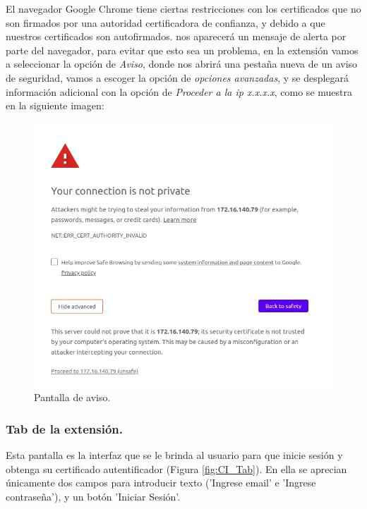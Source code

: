 \documentclass[12pt, a4paper, titlepage]{report}
\begin{document}
    			El navegador Google Chrome tiene ciertas restricciones con los certificados que no son firmados por una autoridad certificadora de confianza, y debido a que nuestros certificados son autofirmados. nos aparecerá un mensaje de alerta por parte del navegador, para evitar que esto sea un problema, en la extensión vamos a seleccionar la opción de \textit{Aviso}, donde nos abrirá una pestaña nueva de un aviso de seguridad, vamos a escoger la opción de \textit{opciones avanzadas}, y se desplegará información adicional con la opción de \textit{Proceder a la ip x.x.x.x}, como se muestra en la siguiente imagen: 
    			
    			\begin{figure}[H]
    				\begin{center}	\includegraphics[width=12cm]{./imagenes/Disenio/Componente_1/Ext_aviso.png}
    				\caption{Pantalla de aviso.}
    		        \label{fig:Ext_aviso}
    				\end{center}
    			\end{figure}
    			
    			\subsubsection{Tab de la extensión.}
    			Esta pantalla es la interfaz que se le brinda al usuario para que inicie sesión y obtenga su certificado autentificador (Figura \ref{fig:CI_Tab}). En ella se aprecian únicamente dos campos para introducir texto ('Ingrese email' e 'Ingrese contraseña'), y un botón 'Iniciar Sesión'.
    			  
\end{document}
